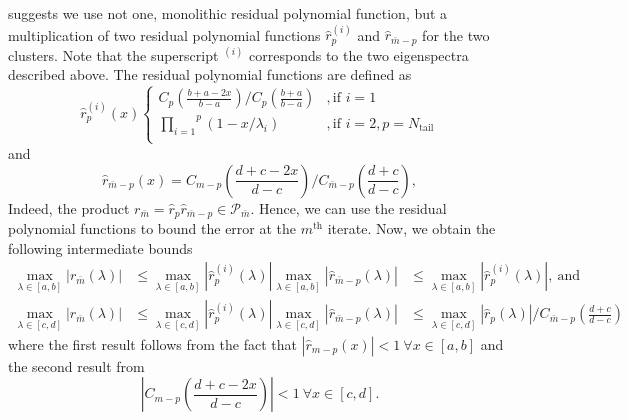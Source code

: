 \citeauthor{cg_sharpened_convrate_Axelsson1976} suggests we use not one, monolithic residual polynomial function, but a multiplication of two residual polynomial functions $\hat{r}^{(i)}_p$ and $\hat{r}_{\bar{m}-p}$ for the two clusters. Note that the superscript $^{(i)}$ corresponds to the two eigenspectra described above. The residual polynomial functions are defined as
\begin{equation}
    \hat{r}^{(i)}_p (x)
    \begin{cases}
        C_p \left(\frac{b + a - 2x}{b - a}\right) / C_p\left(\frac{b + a}{b - a}\right)&, \text{if } i = 1\\
        \overset{p}{\underset{i=1}{\prod}} (1 - x/\lambda_i)&, \text{if } i = 2, p = N_{\text{tail}}\\
    \end{cases}
    \label{eq:residual_polynomial_rm}
\end{equation}
and
\begin{equation}
    \hat{r}_{{\bar{m}}-p} (x) = C_{m-p} \left(\frac{d + c - 2x}{d - c}\right) / C_{{\bar{m}}-p}\left(\frac{d + c}{d - c}\right),
    \label{eq:residual_polynomial_rpm}
\end{equation}
Indeed, the product $r_{\bar{m}} = \hat{r}_p \hat{r}_{\bar{m}-p} \in \mathcal{P}_{\bar{m}}$. Hence, we can use the residual polynomial functions to bound the error at the $m^{\text{th}}$ iterate. Now, we obtain the following intermediate bounds
\begin{subequations}
    \begin{align}
        \max_{\lambda \in [a,b]} |r_{\bar{m}}(\lambda)| &\leq \max_{\lambda \in [a,b]} |\hat{r}^{(i)}_p(\lambda)| \max_{\lambda \in [a,b]} |\hat{r}_{\bar{m}-p}(\lambda)| &\leq \max_{\lambda \in [a,b]} |\hat{r}^{(i)}_p(\lambda)|, \ \text{and} \label{eq:residual_polynomial_bound_ab}\\
        \max_{\lambda \in [c,d]} |r_{\bar{m}}(\lambda)| &\leq \max_{\lambda \in [c,d]} |\hat{r}^{(i)}_p(\lambda)| \max_{\lambda \in [c,d]} |\hat{r}_{\bar{m}-p}(\lambda)| &\leq \max_{\lambda \in [c,d]} |\hat{r}_{p}(\lambda)|/C_{\bar{m}-p}\left(\frac{d+c}{d-c}\right) \label{eq:residual_polynomial_bound_cd}
    \end{align}
\end{subequations}
where the first result follows from the fact that $|\hat{r}_{m-p}(x)| < 1 \ \forall x \in [a,b]$ and the second result from 
\[
    \left|C_{m-p}\left(\frac{d+c -2x}{d-c}\right)\right| < 1 \ \forall x \in [c,d].
\]

